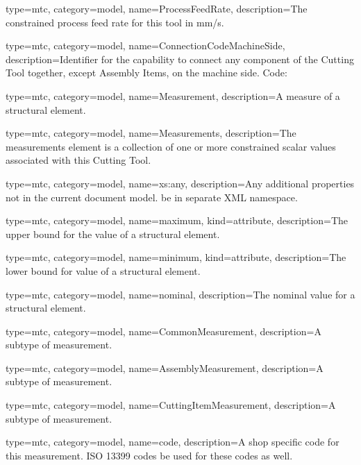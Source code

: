 {
  type=mtc,
  category=model,
  name={ProcessFeedRate},
  description={The constrained process feed rate for this tool in mm/s.}
}


{
  type=mtc,
  category=model,
  name={ConnectionCodeMachineSide},
  description={Identifier for the capability to connect any component of the Cutting Tool together, except Assembly Items, on the machine side. Code: }
}


{
  type=mtc,
  category=model,
  name={Measurement},
  description={A measure of a \gls{structural element}.}
}

{
  type=mtc,
  category=model,
  name={Measurements},
  description={The \gls{measurements} element is a collection of one or more constrained scalar values associated with this Cutting Tool.}
}


{
  type=mtc,
  category=model,
  name={xs:any},
  description={Any additional properties not in the current document model. \MUST be in separate XML namespace.}
}


{
  type=mtc,
  category=model,
  name={maximum},
  kind={attribute},
  description={The upper bound for the value of a \gls{structural element}.}
}


{
  type=mtc,
  category=model,
  name={minimum},
  kind={attribute},
  description={The lower bound for value of a \gls{structural element}.}
}


{
  type=mtc,
  category=model,
  name={nominal},
  description={The nominal value for a \gls{structural element}.}
}




{
  type=mtc,
  category=model,
  name={CommonMeasurement},
  description={A subtype of \gls{measurement}.}
}


{
  type=mtc,
  category=model,
  name={AssemblyMeasurement},
  description={A subtype of \gls{measurement}.}
}


{
  type=mtc,
  category=model,
  name={CuttingItemMeasurement},
  description={A subtype of \gls{measurement}.}
}


{
  type=mtc,
  category=model,
  name={code},
  description={A shop specific code for this measurement. ISO 13399 codes \MAY be used for these codes as well.}
}



